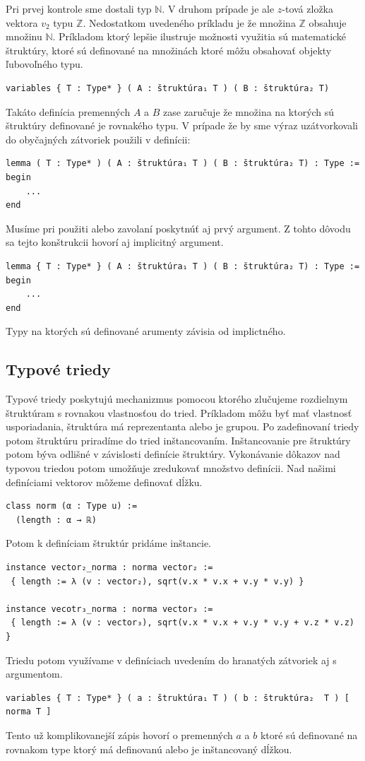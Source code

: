 \documentclass[a4paper,10pt,oneside]{report}%
\begin{document}
    Pri prvej kontrole sme dostali typ $\mathbb{N}$.
    V druhom prípade je ale $z$-tová zložka vektora $v_{2}$ typu $\mathbb{Z}$.
    Nedostatkom uvedeného príkladu je že množina $\mathbb{Z}$ obsahuje
množinu $\mathbb{N}$.
    Príkladom ktorý lepšie ilustruje možnosti využitia sú matematické štruktúry,
ktoré sú definované na množinách ktoré môžu obsahovať objekty ľubovoľného typu.
\begin{lstlisting}
variables { T : Type* } ( A : štruktúra₁ T ) ( B : štruktúra₂ T)
\end{lstlisting}
    Takáto definícia premenných $A$ a $B$ zase zaručuje že množina na ktorých sú
štruktúry definované je rovnakého typu.
    V prípade že by sme výraz uzátvorkovali do obyčajných zátvoriek použili v
definícii:
\begin{lstlisting}
lemma ( T : Type* ) ( A : štruktúra₁ T ) ( B : štruktúra₂ T) : Type :=
begin
    ...
end
\end{lstlisting}
    Musíme pri použiti alebo zavolaní poskytnúť aj prvý argument.
    Z tohto dôvodu sa tejto konštrukcii hovorí aj implicitný argument.
\begin{lstlisting}
lemma { T : Type* } ( A : štruktúra₁ T ) ( B : štruktúra₂ T) : Type :=
begin
    ...
end
\end{lstlisting}
Typy na ktorých sú definované arumenty závisia od implictného.
\subsection{Typové triedy}
    Typové triedy poskytujú mechanizmus pomocou ktorého zlučujeme rozdielnym štruktúram
s rovnakou vlastnosťou do tried.
    Príkladom môžu byť mať vlastnosť usporiadania, štruktúra má reprezentanta alebo
je grupou.
    Po zadefinovaní triedy potom štruktúru priradíme do tried inštancovaním.
    Inštancovanie pre štruktúry potom býva odlišné v závislosti definície štruktúry.
    Vykonávanie dôkazov nad typovou triedou potom umožňuje zredukovať množstvo definícii.
    Nad našimi definíciami vektorov môžeme definovať dĺžku.
\begin{lstlisting}
class norm (α : Type u) :=
  (length : α → ℝ)
\end{lstlisting}
    Potom k definíciam štruktúr pridáme inštancie.
\begin{lstlisting}
instance vector₂_norma : norma vector₂ :=
 { length := λ (v : vector₂), sqrt(v.x * v.x + v.y * v.y) }

instance vecotr₃_norma : norma vector₃ :=
 { length := λ (v : vector₃), sqrt(v.x * v.x + v.y * v.y + v.z * v.z) }
\end{lstlisting}
    Triedu potom využívame v definíciach uvedením do hranatých zátvoriek aj s
argumentom.
\begin{lstlisting}
variables { T : Type* } ( a : štruktúra₁ T ) ( b : štruktúra₂  T ) [ norma T ]
\end{lstlisting}
    Tento už komplikovanejší zápis hovorí o premenných $a$ a $b$ ktoré sú definované
na rovnakom type ktorý má definovanú alebo je inštancovaný dĺžkou.
\end{document}
